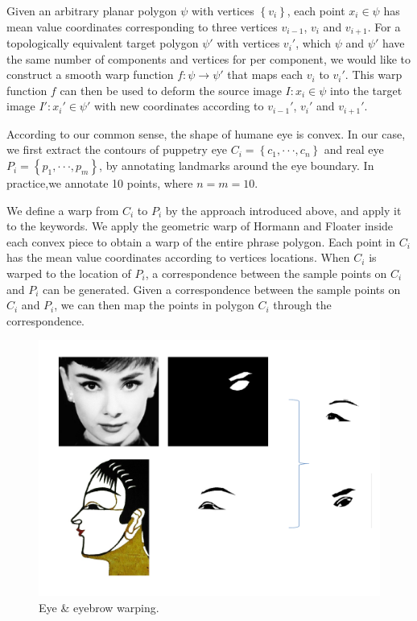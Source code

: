 \documentclass[letter]{sig-alternate}
\begin{document}
Given an arbitrary planar polygon $\psi$ with vertices $\left\{v_{i}\right\}$, each point $x_{i}\in\psi$ has mean value coordinates corresponding to three vertices $v_{i-1}$, $v_{i}$ and $v_{i+1}$. For a topologically equivalent target polygon $\psi'$ with vertices $v_{i}'$, which $\psi$ and $\psi'$ have the same number of components and vertices for per component, we would like to construct a smooth warp function $f:\psi \rightarrow \psi'$ that maps each $v_{i}$ to $v_{i}'$. This warp function $f$ can then be used to deform the source image $I:x_{i}\in\psi$ into the target image $I':x_{i}'\in\psi'$ with new coordinates according to $v_{i-1}'$, $v_{i}'$ and $v_{i+1}'$.

According to our common sense, the shape of humane eye is convex. In our case, we first extract the contours of puppetry eye $C_i = \left\{ c_{1},\cdot \cdot\cdot , c_{n}\right\}$ and real eye $P_i = \left\{ p_{1},\cdot \cdot\cdot , p_{m}\right\}$,  by annotating landmarks around the eye boundary. In practice,we annotate 10 points, where $n=m=10$.

We define a warp from $C_i$ to $P_i$ by the approach introduced above, and apply it to the keywords. We apply the geometric warp of Hormann and Floater  \cite{hormann2006mean} inside each convex piece to obtain a warp of the entire phrase polygon. Each point in $C_i$ has the mean value coordinates according to vertices locations. When $C_i$ is warped to the location of $P_i$, a correspondence between the sample points on $C_i$ and $P_i$ can be generated. Given a correspondence between the sample points on $C_i$ and $P_i$, we can then map the points in polygon $C_i$ through the correspondence. 





\begin{figure}[t]
\begin{center}
\includegraphics[scale=0.3]{figure/eyewarping.pdf}
\caption{\small{Eye \& eyebrow warping.}}
\label{fig:firstfig}
\end{center}
\end{figure}
\end{document}
